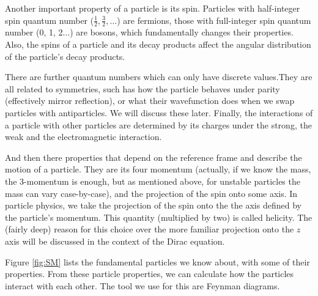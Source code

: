 Another important property of a particle is its spin. Particles with half-integer spin quantum number ($\frac{1}{2}, \frac{3}{2}, \ldots$)  are fermions, those with full-integer spin quantum number (0, 1, 2...) are bosons, which fundamentally changes their properties. Also, the spins of a particle and its decay products affect the angular distribution of the particle's decay products. 

There are further quantum numbers which can only have discrete values.They are all related to symmetries, such has how the particle behaves under parity (effectively mirror reflection), or what their wavefunction does when we swap particles with antiparticles.  We will discuss these later. Finally, the interactions of a particle with other particles are determined by its charges under the strong, the weak and the electromagnetic interaction.

And then there properties that depend on the reference frame and describe the motion of a particle. They are its four momentum (actually, if we know the mass, the 3-momentum is enough, but as mentioned above, for unstable particles the mass can vary case-by-case), and the projection of the spin onto some axis. In particle physics, we  take the projection of the spin onto the the axis defined by the particle's momentum. This quantity (multiplied by two) is called helicity. The (fairly deep) reason for this choice over the more familiar projection onto the $z$ axis will be discussed in the context of the Dirac equation.


Figure \ref{fig:SM} lists the fundamental particles we know about, with some of their properties. From these particle properties, we can calculate how the particles interact with each other. The tool we use for this are Feynman diagrams.

